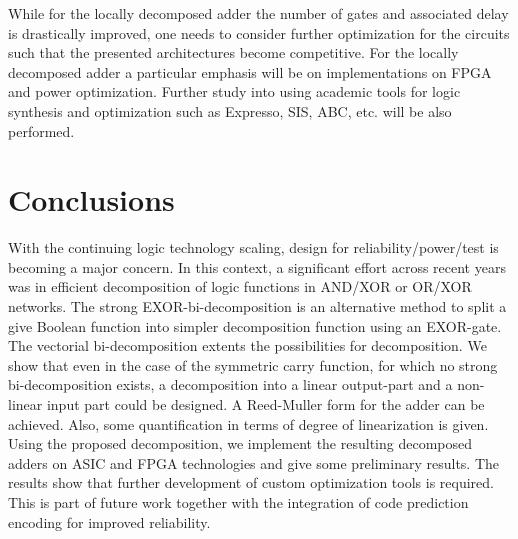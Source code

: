\documentclass[a4paper]{article}
\begin{document}
While for the locally decomposed adder the number of gates and associated delay is drastically improved, one needs to consider further optimization for the circuits such that the presented architectures become competitive. For the locally decomposed adder a particular emphasis will be on implementations on FPGA and power optimization. Further study into using academic tools for logic synthesis and optimization such as Expresso, SIS, ABC, etc. will be also performed. 


\section{Conclusions}
With the continuing logic technology scaling, design for reliability/power/test is becoming a major concern. In this context, a significant effort across recent years was in efficient decomposition of logic functions in AND/XOR or OR/XOR networks.
The strong EXOR-bi-decomposition is an alternative method to split a
give Boolean function into simpler decomposition function using an EXOR-gate.
The vectorial bi-decomposition extents the possibilities for decomposition. We show that even in
the case of the symmetric carry function, for which no strong bi-decomposition
exists, a decomposition into a linear output-part and a non-linear input part
could be designed. A Reed-Muller form for the adder can be achieved. Also, some quantification in terms of degree of linearization is given. Using the proposed decomposition, we implement the resulting decomposed adders on ASIC and FPGA technologies and give some preliminary results. The results show that further development of custom optimization tools is required. This is part of future work together with the integration of code prediction encoding for improved reliability.


\printbibliography[heading=bibintoc]
\end{document}
